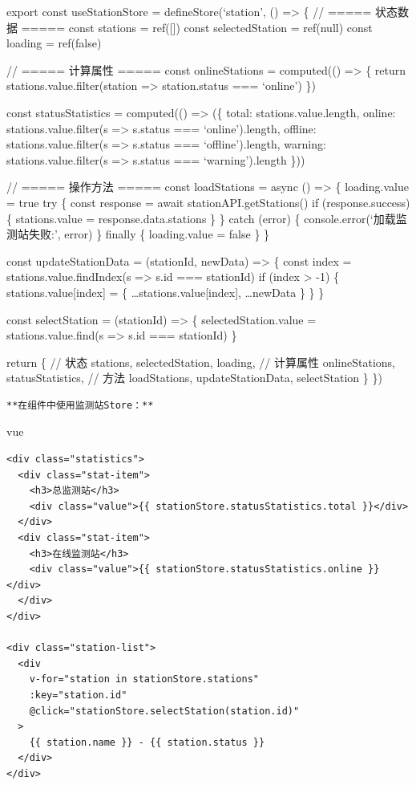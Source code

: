 {{export const useStationStore = defineStore(`station', () =\textgreater{} \{ // ===== 状态数据 ===== const stations = ref({[}{]}) const selectedStation = ref(null) const loading = ref(false)

// ===== 计算属性 ===== const onlineStations = computed(() =\textgreater{} \{ return stations.value.filter(station =\textgreater{} station.status === `online') \})

const statusStatistics = computed(() =\textgreater{} (\{ total: stations.value.length, online: stations.value.filter(s =\textgreater{} s.status === `online').length, offline: stations.value.filter(s =\textgreater{} s.status === `offline').length, warning: stations.value.filter(s =\textgreater{} s.status === `warning').length \}))

// ===== 操作方法 ===== const loadStations = async () =\textgreater{} \{ loading.value = true try \{ const response = await stationAPI.getStations() if (response.success) \{ stations.value = response.data.stations \} \} catch (error) \{ console.error(`加载监测站失败:', error) \} finally \{ loading.value = false \} \}

const updateStationData = (stationId, newData) =\textgreater{} \{ const index = stations.value.findIndex(s =\textgreater{} s.id === stationId) if (index \textgreater{} -1) \{ stations.value{[}index{]} = \{ \ldots stations.value{[}index{]}, \ldots newData \} \} \}

const selectStation = (stationId) =\textgreater{} \{ selectedStation.value = stations.value.find(s =\textgreater{} s.id === stationId) \}

return \{ // 状态 stations, selectedStation, loading, // 计算属性 onlineStations, statusStatistics, // 方法 loadStations, updateStationData, selectStation \} \})

\begin{lstlisting}
**在组件中使用监测站Store：**
\end{lstlisting}

vue

\begin{verbatim}
<div class="statistics">
  <div class="stat-item">
    <h3>总监测站</h3>
    <div class="value">{{ stationStore.statusStatistics.total }}</div>
  </div>
  <div class="stat-item">
    <h3>在线监测站</h3>
    <div class="value">{{ stationStore.statusStatistics.online }}</div>
  </div>
</div>

<div class="station-list">
  <div 
    v-for="station in stationStore.stations" 
    :key="station.id"
    @click="stationStore.selectStation(station.id)"
  >
    {{ station.name }} - {{ station.status }}
  </div>
</div>
\end{verbatim}

}}

